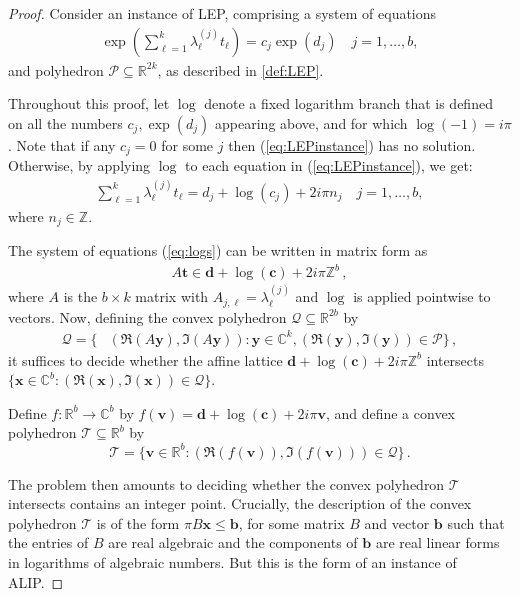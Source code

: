 \begin{proof}
Consider an instance of LEP, comprising a system of equations
\begin{align}
 \exp\left(\sum_{\ell=1}^k \lambda_\ell^{(j)} t_\ell \right) = c_j \exp (d_j)
\quad j=1,\ldots,b,
\label{eq:LEPinstance}
\end{align}
and polyhedron $\mathcal{P}\subseteq \mathbb{R}^{2k}$, as described in
\cref{def:LEP}.

Throughout this proof, let $\log$ denote a fixed logarithm branch that
is defined on all the numbers $c_j, \exp(d_j)$ appearing
above, and for which $\log(-1) = i \pi$. Note that if any $c_j=0$ for
some $j$ then (\ref{eq:LEPinstance}) has no solution. Otherwise, by
applying $\log$ to each equation in (\ref{eq:LEPinstance}),
we get:
\begin{align}
\sum_{\ell=1}^k \lambda_\ell^{(j)} t_\ell = d_j+\log(c_j) + 2i\pi n_j \quad j=1,\ldots,b,
\label{eq:logs}
\end{align}
where $n_j \in \mathbb{Z}$.

The system of equations (\ref{eq:logs}) can be written in matrix form as
\begin{align*}
A \boldsymbol{t} \in \boldsymbol{d}+\log(\boldsymbol{c}) +
2i\pi \mathbb{Z}^b \, ,
\end{align*}
where $A$ is the $b\times k$ matrix with $A_{j,\ell} = \lambda_\ell^{(j)}$ and $\log$
is applied pointwise to vectors.
Now, defining the convex polyhedron $\mathcal{Q}\subseteq \mathbb{R}^{2b}$ by
\begin{align*}
\mathcal{Q} = \lbrace &(\Re(A\boldsymbol{y}), \Im(A\boldsymbol{y})) :
\boldsymbol{y}\in\mathbb{C}^k, (\Re(\boldsymbol{y}), \Im(\boldsymbol{y})) \in \mathcal{P} \rbrace \, ,
\end{align*}
it suffices to decide whether the affine lattice
$\boldsymbol{d} + \log(\boldsymbol{c})+ 2i\pi  \mathbb{Z}^b$
intersects
$\lbrace \boldsymbol{x} \in \mathbb{C}^b : (\Re(\boldsymbol{x}),
\Im(\boldsymbol{x})) \in \mathcal{Q} \rbrace$.

Define $f:\mathbb{R}^b \rightarrow \mathbb{C}^b$ by
$f(\boldsymbol{v})= \boldsymbol{d} + \log(\boldsymbol{c}) +
2i\pi \boldsymbol{v}$,
and define a convex polyhedron $\mathcal{T}\subseteq \mathbb{R}^b$ by
\[\mathcal{T}=\{ \boldsymbol{v}\in\mathbb{R}^b : (\Re(f(\boldsymbol{v})),
\Im (f(\boldsymbol{v}))) \in \mathcal{Q} \} \, . \]

The problem then amounts to deciding whether the convex polyhedron
$\mathcal{T}$ intersects contains an integer point. Crucially, the
description of the convex polyhedron $\mathcal{T}$ is of the form
$\pi B\boldsymbol{x} \leq \boldsymbol{b}$, for some matrix $B$ and
vector $\boldsymbol{b}$ such that the entries of $B$ are real
algebraic and the components of $\boldsymbol{b}$ are real linear forms
in logarithms of algebraic numbers.  But this is the form of an
instance of ALIP.
\end{proof}

